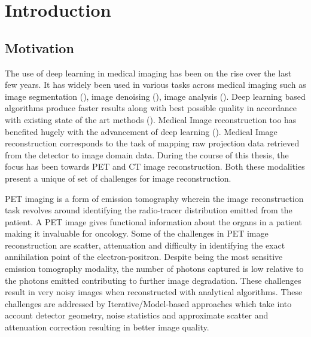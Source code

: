 
\chapter*{Introduction} %
\label{Introduction} %


\section{Motivation}

The use of deep learning in medical imaging has been on the rise over the last few years. It has widely been used in various tasks across medical imaging such as image segmentation  (\cite{ronneberger2015u,guo2019deep,sinha2019multi,dolz2018hyperdense,hatt2018first}), image denoising (\cite{kadimesetty2018convolutional,li2020sacnn,chen2017low,yang2018low}), image analysis (\cite{litjens2017survey,amyar20193,cui2018artificial}). %
Deep learning based algorithms produce faster results along with best possible quality in accordance with existing state of the art methods (\cite{leuschner2021quantitative}). Medical Image reconstruction too has benefited hugely with the advancement of deep learning (\cite{reader2020deep,zhang2020review}).
Medical Image reconstruction corresponds to the task of mapping raw projection data retrieved from the detector to image domain data. During the course of this thesis, the focus has been towards \ac{PET} and \ac{CT} image reconstruction. Both these modalities present a unique of set of challenges for image reconstruction. 
 
\ac{PET} imaging is a form of emission tomography wherein the image reconstruction task revolves around identifying the radio-tracer distribution emitted from the patient. A \ac{PET} image gives functional information about the organs in a patient making it invaluable for oncology. Some of the challenges in \ac{PET} image reconstruction are scatter, attenuation and difficulty in identifying the exact annihilation point of the electron-positron. Despite being the most sensitive emission tomography modality, the number of photons captured is low relative to the photons emitted contributing to further image degradation. These challenges result in very noisy images when reconstructed with analytical algorithms. These challenges are addressed by  Iterative/Model-based approaches which take into account detector geometry, noise statistics and approximate scatter and attenuation correction resulting in better image quality. 

